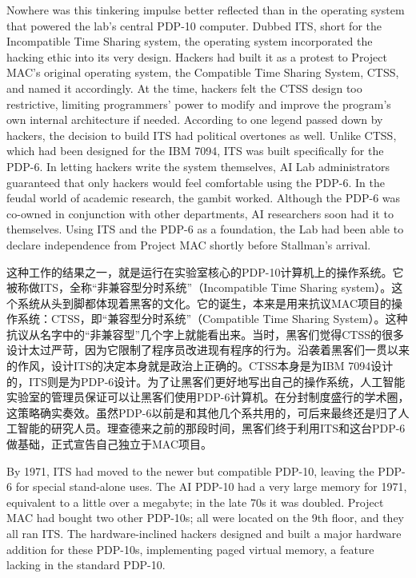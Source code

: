 \ifdefined\eng
Nowhere was this tinkering impulse better reflected than in the operating system that powered the lab's central PDP-10 computer. Dubbed ITS, short for the Incompatible Time Sharing system, the operating system incorporated the hacking ethic into its very design. Hackers had built it as a protest to Project MAC's original operating system, the Compatible Time Sharing System, CTSS, and named it accordingly. At the time, hackers felt the CTSS design too restrictive, limiting programmers' power to modify and improve the program's own internal architecture if needed. According to one legend passed down by hackers, the decision to build ITS had political overtones as well. Unlike CTSS, which had been designed for the IBM 7094, ITS was built specifically for the PDP-6. In letting hackers write the system themselves, AI Lab administrators guaranteed that only hackers would feel comfortable using the PDP-6. In the feudal world of academic research, the gambit worked. Although the PDP-6 was co-owned in conjunction with other departments, AI researchers soon had it to themselves.  Using ITS and the PDP-6 as a foundation, the Lab had been able to declare independence from Project MAC shortly before Stallman's arrival.
\fi

\ifdefined\chs
这种工作的结果之一，就是运行在实验室核心的PDP-10计算机上的操作系统。它被称做ITS，全称``非兼容型分时系统''（Incompatible Time Sharing system）。这个系统从头到脚都体现着黑客的文化。它的诞生，本来是用来抗议MAC项目的操作系统：CTSS，即``兼容型分时系统''（Compatible Time Sharing System）。这种抗议从名字中的``非兼容型''几个字上就能看出来。当时，黑客们觉得CTSS的很多设计太过严苛，因为它限制了程序员改进现有程序的行为。沿袭着黑客们一贯以来的作风，设计ITS的决定本身就是政治上正确的。CTSS本身是为IBM 7094设计的，ITS则是为PDP-6设计。为了让黑客们更好地写出自己的操作系统，人工智能实验室的管理员保证可以让黑客们使用PDP-6计算机。在分封制度盛行的学术圈，这策略确实奏效。虽然PDP-6以前是和其他几个系共用的，可后来最终还是归了人工智能的研究人员。理查德来之前的那段时间，黑客们终于利用ITS和这台PDP-6做基础，正式宣告自己独立于MAC项目。
\fi

\ifdefined\eng
By 1971, ITS had moved to the newer but compatible PDP-10, leaving the PDP-6 for special stand-alone uses. The AI PDP-10 had a very large memory for 1971, equivalent to a little over a megabyte; in the late 70s it was doubled.   Project MAC had bought two other PDP-10s; all were located on the 9th floor, and they all ran ITS.  The hardware-inclined hackers designed and built a major hardware addition for these PDP-10s, implementing paged virtual memory, a feature lacking in the standard PDP-10.
\fi

